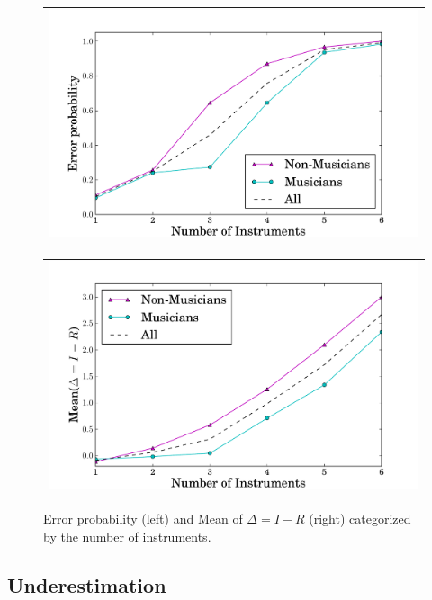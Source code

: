 \begin{figure}[h]
\begin{minipage}{0.5\textwidth}
\begin{tabular}{c}
	\includegraphics[width=\textwidth]{Chapters/07_Analysis_Experiment/ica/images/error_means.pdf}
\end{tabular}
\end{minipage}
\begin{minipage}{0.5\textwidth}
\begin{tabular}{c}
	\includegraphics[width=\textwidth]{Chapters/07_Analysis_Experiment/ica/images/error_diff.pdf}
\end{tabular}
\end{minipage}
\caption{Error probability (left) and Mean of $\Delta = I-R$ (right) categorized by the number of instruments.}
\label{fig:meanerror}
\end{figure}
\vspace{-1.0em}

\subsection{Underestimation}

